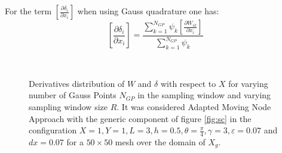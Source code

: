 For the term $\left[\frac{\partial \delta_i}{\partial x_i}\right]$ when using Gauss quadrature one has:
\begin{equation}
    \left[\frac{\partial \delta_i}{\partial x_i}\right]   = \frac{\sum_{k=1}^{N_{GP}}{\psi_k\left[\frac{\partial W_{ik}}{\partial x_i}\right]}}{\sum_{k=1}^{N_{GP}}\psi_k} 
\end{equation}
\begin{figure}[!ht]
\centering
    \quad
    \\
        \quad
        \caption{Derivatives distribution of $W$ and $\delta$ with respect to $X$ for varying number of Gauss Points $N_{GP}$ in the sampling window and varying sampling window size $R$. It was considered Adapted Moving Node Approach with the generic component of figure \ref{fig:sc} in the configuration  $X=1,Y=1,L=3,h=0.5,\theta=\frac{\pi}{4}, \gamma=3, \varepsilon=0.07$ and  $dx=0.07$ for a $50\times50$ mesh over the domain of $X_g$.}%
    \label{fig:sens_text}%
\end{figure}
